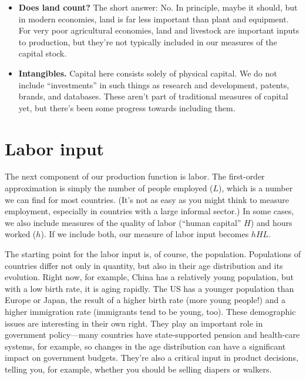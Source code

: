 \begin{itemize}
\item \textbf{Does land count?}  The short answer:  No.
In principle, maybe it should, but in modern economies, land is far less important
than plant and equipment.
For very poor agricultural economies, land and livestock are important
inputs to production, but they're not typically included in our
measures of the capital stock.

\item \textbf{Intangibles.}
Capital here consists solely of physical capital.
We do not include ``investments'' in such things
as research and development, patents, brands, and databases.
These aren't part of traditional measures of capital yet,
but there's been some progress towards including them.

\end{itemize}



\section{Labor 
 input}

The next component of our production function is labor.
The first-order approximation is simply the number of people employed ($L$),
which is a number we can find for most countries.
(It's not as easy as you might think to measure employment,
especially in countries with a large informal sector.)
In some cases, we also include measures of the quality of labor
(``human capital'' $H$) and hours worked ($h$).
If we include both, our measure of labor input becomes
$hHL$.


The starting point for the labor input is, of course, the population.
Populations of countries differ not only in quantity,
but also in their age distribution and its evolution.
Right now, for example, China has a relatively young population,
but with a low birth rate, it is aging rapidly.
The US has a younger population than Europe or Japan,
the result of a higher birth rate (more young people!)
and a higher immigration rate (immigrants tend to be young, too).
These demographic issues are interesting in their own right.
They play an important role in government policy---many countries have state-supported pension and health-care systems,
for example, so changes in the age distribution can have
a significant impact on government budgets.
They're also a critical input in product decisions,
telling you, for example, whether you should be selling
diapers or walkers.


